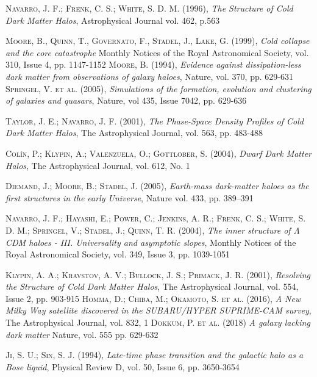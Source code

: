 \documentclass[a4paper,openright,12pt]{book}
\begin{document}
\begin{thebibliography}{a}

 \textsc{Navarro, J. F.; Frenk, C. S.; White, S. D. M. (1996)},
\textit{The Structure of Cold Dark Matter Halos},
Astrophysical Journal vol. 462, p.563

 \textsc{Moore, B., Quinn, T., Governato, F., Stadel, J., Lake, G. (1999)},
\textit{Cold collapse and the core catastrophe}
Monthly Notices of the Royal Astronomical Society, vol. 310, Issue 4, pp. 1147-1152
 \textsc{Moore, B. (1994)},
\textit{Evidence against dissipation-less dark matter from observations of galaxy haloes},
Nature, vol. 370, pp. 629-631 
 \textsc{Springel, V. et al. (2005)},
\textit{Simulations of the formation, evolution and clustering of galaxies and quasars},
Nature, vol 435, Issue 7042, pp. 629-636

\textsc{Taylor, J. E.; Navarro, J. F. (2001)},
\textit{The Phase-Space Density Profiles of Cold Dark Matter Halos},
The Astrophysical Journal, vol. 563, pp. 483-488

\textsc{Colín, P.; Klypin, A.; Valenzuela, O.; Gottlöber, S. (2004)},
\textit{Dwarf Dark Matter Halos},
The Astrophysical Journal, vol. 612, No. 1

\textsc{Diemand, J.; Moore, B.; Stadel, J. (2005)},
\textit{Earth-mass dark-matter haloes as the first structures in the early Universe},
Nature vol. 433, pp. 389–391

 \textsc{Navarro, J. F.; Hayashi, E.; Power, C.; Jenkins, A. R.; Frenk, C. S.; White, S. D. M.; Springel, V.; Stadel, J.; Quinn, T. R. (2004)}, 
\textit{The inner structure of $\Lambda$CDM haloes - III. Universality and asymptotic slopes}, 
Monthly Notices of the Royal Astronomical Society, vol. 349, Issue 3, pp. 1039-1051

 \textsc{Klypin, A. A.; Kravstov, A. V.; Bullock, J. S.; Primack, J. R. (2001)},
\textit{Resolving the Structure of Cold Dark Matter Halos},
The Astrophysical Journal, vol. 554, Issue 2, pp. 903-915
 \textsc{Homma, D.; Chiba, M.; Okamoto, S. et al. (2016)},
\textit{A New Milky Way satellite discovered in the SUBARU/HYPER SUPRIME-CAM survey},
The Astrophysical Journal, vol. 832, 1
 \textsc{Dokkum, P. et al. (2018)}
\textit{A galaxy lacking dark matter}
Nature, vol. 555 pp. 629-632

 \textsc{Ji, S. U.; Sin, S. J. (1994)},
\textit{Late-time phase transition and the galactic halo as a Bose liquid},
Physical Review D, vol. 50, Issue 6, pp. 3650-3654 


\end{thebibliography}
\end{document}
